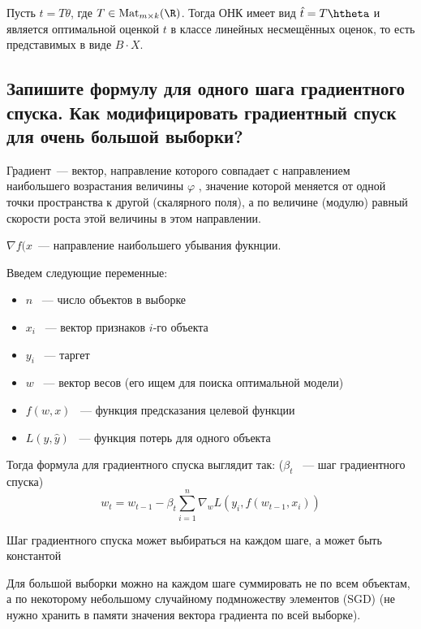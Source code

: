 \Thbd Пусть $t = T\theta$, где $T \in \text{Mat}_{m \times k}(\R)$. Тогда ОНК имеет вид $\hat{t} = T\htheta$ и является оптимальной оценкой $t$ в классе линейных несмещённых оценок, то есть представимых в виде $B\cdot X$.





\subsection{Запишите формулу для одного шага градиентного спуска. Как модифицировать градиентный спуск для очень большой выборки?}

\Def Градиент~--- вектор, направление которого совпадает с направлением наибольшего возрастания величины $\varphi$ , значение которой меняется от одной точки пространства к другой (скалярного поля), а по величине (модулю) равный скорости роста этой величины в этом направлении.

\Note $\nabla f(x$~--- направление наибольшего убывания фукнции.

Введем следующие переменные:

\begin{itemize}
    \item $n$ ~--- число объектов в выборке
    \item $x_i$ ~--- вектор признаков $i$-го объекта
    \item $y_i$ ~--- таргет
    \item $w$ ~--- вектор весов (его ищем для поиска оптимальной модели)
    \item $f(w,x)$ ~--- функция предсказания целевой функции
    \item $L(y, \hat{y})$ ~--- функция потерь для одного объекта
\end{itemize}

Тогда формула для градиентного спуска выглядит так: ($\beta_t$ ~--- шаг градиентного спуска)
$$w_t = w_{t-1} - \beta_t\sum\limits_{i=1}^{n} \nabla_wL(y_i, f(w_{t-1}, x_i))$$

\Note Шаг градиентного спуска может выбираться на каждом шаге, а может быть константой

\Note Для большой выборки можно на каждом шаге суммировать не по всем объектам, а по некоторому небольшому случайному подмножеству элементов (SGD) (не нужно хранить в памяти значения вектора градиента по всей выборке).









